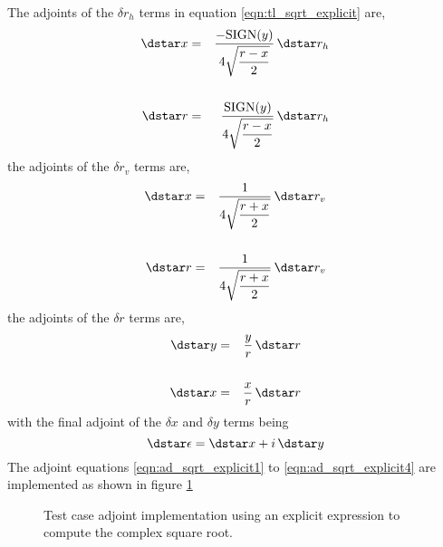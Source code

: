 The adjoints of the $\delta r_h$ terms in equation \ref{eqn:tl_sqrt_explicit} are,
\begin{eqnarray}
  \dstar x &=& \displaystyle\frac{-\textrm{SIGN}(y)}{4\sqrt{\displaystyle\frac{r-x}{2}}}\, \dstar r_h\nonumber\\
  & & \label{eqn:ad_sqrt_explicit1}\\
  \dstar r &=& \displaystyle\frac{\textrm{SIGN}(y)}{4\sqrt{\displaystyle\frac{r-x}{2}}}\, \dstar r_h\nonumber
\end{eqnarray}
the adjoints of the $\delta r_v$ terms are,
\begin{eqnarray}
  \dstar x &=& \displaystyle\frac{1}{4\sqrt{\displaystyle\frac{r+x}{2}}}\, \dstar r_v\nonumber\\
  & & \label{eqn:ad_sqrt_explicit2}\\
  \dstar r &=& \displaystyle\frac{1}{4\sqrt{\displaystyle\frac{r+x}{2}}}\, \dstar r_v\nonumber
\end{eqnarray}
the adjoints of the $\delta r$ terms are,
\begin{eqnarray}
  \dstar y &=& \displaystyle\frac{y}{r}\, \dstar r\nonumber\\
  & & \label{eqn:ad_sqrt_explicit3}\\
  \dstar x &=& \displaystyle\frac{x}{r}\, \dstar r\nonumber
\end{eqnarray}
with the final adjoint of the $\delta x$ and $\delta y$ terms being
\begin{equation}
  \dstar\epsilon = \dstar x + i\,\dstar y
  \label{eqn:ad_sqrt_explicit4}
\end{equation}
The adjoint equations \ref{eqn:ad_sqrt_explicit1} to \ref{eqn:ad_sqrt_explicit4} are implemented as shown in figure \ref{fig:ad_code_explicit}
\begin{figure}[htp]
  \centering
  \caption{Test case adjoint implementation using an explicit expression to compute the complex square root.}
  \label{fig:ad_code_explicit}
\end{figure}

